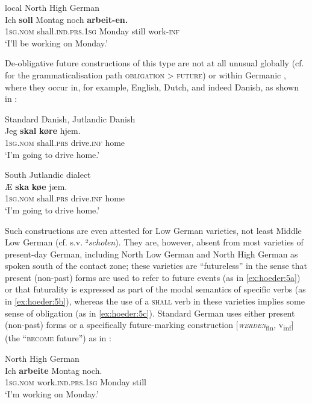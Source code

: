 \documentclass[output=paper]{langsci/langscibook}
\begin{document}
	\ex\label{ex:hoeder:3b}
	local North High German\\
	\gll Ich \textbf{soll} Montag noch \textbf{arbeit-en.}\\
     1\textsc{sg.nom} shall.\textsc{ind.prs}.1\textsc{sg}{} Monday still{} work-\textsc{inf}\\
	\glt `I’ll be{} working on Monday.'
\z
\z

De-obligative future constructions of this type are not at all unusual globally (cf. \citealt[288]{Kuteva.2019} for the grammaticalisation path \textsc{obligation} > \textsc{future}) or within Germanic \citep[319--320]{Dahl.2000}, where they occur in, for example, English, Dutch, and indeed Danish, as shown in :

\ea\label{ex:hoeder:4}
	\ea\label{ex:hoeder:4a}
	Standard Danish, Jutlandic Danish\\
	\gll Jeg \textbf{skal} \textbf{køre}{} hjem.\\
     {\textsc{1sg.nom}} shall\textsc{.prs} drive.\textsc{inf} home\\
	\glt `I’m going to drive home.'

	\ex\label{ex:hoeder:4b}
		South Jutlandic dialect\\
		\gll Æ \textbf{ska} \textbf{køe}{} jæm.\\
    	 1\textsc{sg.nom} shall.\textsc{prs} drive.\textsc{inf} home\\
	\glt `I’m going{} to drive home.'
\z
\z

Such constructions are even attested for Low German varieties, not least Middle Low German (cf. \citealt{Schiller.1875} s.v. ²\textit{scholen}). They are, however, absent from most varieties of present-day German, including North Low German and North High German as spoken south of the contact zone; these varieties are “futureless” in the sense that present (non-past) forms are used to refer to future events (as in \ref{ex:hoeder:5a}) or that futurality is expressed as part of the modal{ semantics of specific verbs (as in \ref{ex:hoeder:5b}), whereas the use of a \textsc{shall}} verb in these varieties implies some sense of obligation (as in \ref{ex:hoeder:5c}). Standard German uses either present (non-past) forms or a specifically future-marking construction {[}\textit{\textsc{werden}}\textsubscript{fin}, \textsc{v}\textsubscript{inf}{]} (the “\textsc{become} future”) as in :

 
\ea\label{ex:hoeder:5}
 	\ea\label{ex:hoeder:5a}
	North High German\\
	\gll Ich \textbf{arbeite} Montag noch.\\
     \textsc{1sg.nom} work.\textsc{ind.prs}.\textsc{1sg} Monday still\\
	\glt `I’m working on Monday.'
\end{document}
